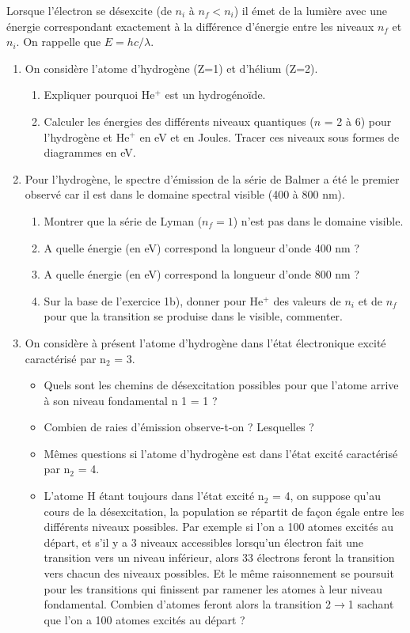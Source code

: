 Lorsque l'\'electron se d\'esexcite (de $n_i$ \`a $n_f < n_i$) il \'emet de la lumi\`ere
avec une \'energie correspondant exactement \`a la diff\'erence d'\'energie entre les
niveaux $n_f$ et $n_i$.
On rappelle que $E=hc/\lambda$.
\begin{enumerate}[\bf 1)]
\item On consid\`ere l'atome d'hydrog\`ene (Z=1) et d'h\'elium (Z=2).
\begin{enumerate}
\item Expliquer pourquoi He$^+$ est un hydrog\'eno\"ide.
\item Calculer les \'energies des diff\'erents niveaux quantiques ($n$ = 2 \`a 6) pour l'hydrog\`ene et He$^+$
en eV et en Joules. Tracer ces niveaux sous formes de diagrammes en eV.
\end{enumerate}

\item Pour l'hydrog\`ene, le spectre d'\'emission de la s\'erie de Balmer
a \'et\'e le premier observ\'e car il est dans le domaine spectral visible (400 \`a 800 nm).
\begin{enumerate}
\item Montrer que la s\'erie de Lyman ($n_f =1$) n'est pas dans le domaine visible.
\item A quelle \'energie (en eV) correspond la longueur d'onde 400 nm ?
\item A quelle \'energie (en eV) correspond la longueur d'onde 800 nm ?
\item Sur la base de l'exercice 1b), donner pour He$^+$ des valeurs de $n_i$ et de $n_f$ pour
que la transition se produise dans le visible, commenter.
\end{enumerate}

\item On considère à présent l’atome d’hydrogène dans l’état électronique excité caractérisé par
n$_2$ = 3.
\begin{itemize}
\item Quels sont les chemins de désexcitation possibles pour que l’atome arrive à son niveau
fondamental n 1 = 1 ?
\item Combien de raies d’émission observe-t-on ? Lesquelles ?
\item Mêmes questions si l’atome d’hydrogène est dans l’état excité caractérisé par n$_2$ = 4.
\item L’atome H étant toujours dans l’état excité n$_2$ = 4, on suppose qu’au cours de la
désexcitation, la population se répartit de façon égale entre les différents niveaux
possibles. Par exemple si l’on a 100 atomes excités au départ, et s’il y a 3 niveaux
accessibles lorsqu’un électron fait une transition vers un niveau inférieur, alors 33
électrons feront la transition vers chacun des niveaux possibles. Et le même
raisonnement se poursuit pour les transitions qui finissent par ramener les atomes à
leur niveau fondamental. Combien d’atomes feront alors la transition 2$\rightarrow$1 sachant que
l’on a 100 atomes excités au départ ?
\end{itemize}



\end{enumerate}

